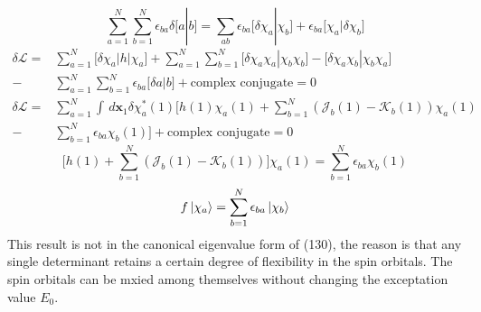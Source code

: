 \documentclass[11pt]{article}
\begin{document}
\begin{equation}
    \sum_{a=1}^{N}\sum_{b=1}^{N}\epsilon_{ba}\delta\big[a|b\big]=\sum_{ab}\epsilon_{ba}\big[\delta \chi_a|\chi_b\big]+\epsilon_{ba}\big[\chi_a|\delta \chi_b\big]
\end{equation}
\begin{equation}
    \begin{split}
        \delta\mathcal{L}=&\sum_{a=1}^{N}\big[\delta\chi_a|h|\chi_a\big]+\sum_{a=1}^{N}\sum_{b=1}^{N}\big[\delta\chi_a\chi_a|\chi_b\chi_b\big]-\big[\delta\chi_a\chi_b|\chi_b\chi_a\big]\\
        -&\sum_{a=1}^{N}\sum_{b=1}^{N}\epsilon_{ba}\big[\delta a|b\big]+\text{complex conjugate}=0\\
        \delta\mathcal{L}=&\sum_{a=1}^{N}\int\,d\mathbf{x}_1\delta \chi_a^*(1)\Bigg[h(1)\chi_a(1)+\sum_{b=1}^{N}(\mathcal{J}_b(1)-\mathcal{K}_b(1))\chi_a(1)\\
        -&\sum_{b=1}^{N}\epsilon_{ba}\chi_b(1)\Bigg]+\text{complex conjugate}=0
    \end{split}
\end{equation}
\begin{equation}
    \Bigg[h(1)+\sum_{b=1}^{N}(\mathcal{J}_b(1)-\mathcal{K}_b(1))\Bigg]\chi_a(1)=\sum_{b=1}^{N}\epsilon_{ba}\chi_b(1)
\end{equation}
\begin{equation}
    f\ket{\chi_a}=\sum_{b=1}^{N}\epsilon_{ba}\ket{\chi_b}
\end{equation}
This result is not in the canonical eigenvalue form of (130), the reason is that any single determinant retains a certain degree of flexibility
in the spin orbitals. The spin orbitals can be mxied among themselves without changing the exceptation value $E_0$.
\end{document}
